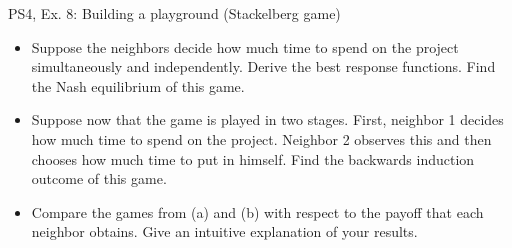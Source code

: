 \begin{frame}{PS4, Ex. 8: Building a playground (Stackelberg game)}
  \begin{multicols}{2}
    \begin{itemize}
      \item[(a)] Suppose the neighbors decide how much time to spend on the project simultaneously and independently. Derive the best response functions. Find the Nash equilibrium of this game.
    \end{itemize}
  \vfill\null \columnbreak
    \begin{itemize}
      \item[(b)] Suppose now that the game is played in two stages. First, neighbor 1 decides how much time to spend on the project. Neighbor 2 observes this and then chooses how much time to put in himself. Find the backwards induction outcome of this game.
    \end{itemize}
    \begin{itemize}
      \item[(c)] Compare the games from (a) and (b) with respect to the payoff that each neighbor obtains. Give an intuitive explanation of your results.
    \end{itemize}
  \vfill\null
  \end{multicols}
\end{frame}



%


